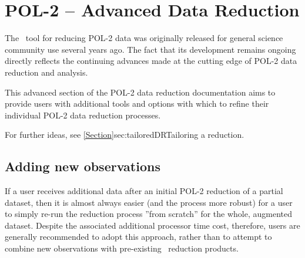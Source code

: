 \chapter{POL-2 -- Advanced Data Reduction}
\label{sec:advanced}

The \poltwomap\ tool for reducing POL-2 data was originally released for
general science community use several years ago. The fact that its
development remains ongoing directly reflects the continuing advances
made at the cutting edge of POL-2 data reduction and analysis.

This advanced section of the POL-2 data reduction documentation aims
to provide users with additional tools and options with which to refine their
individual POL-2 data reduction processes.

For further ideas, see \cref{Section}{sec:tailoredDR}{Tailoring a reduction}.

\section{Adding new observations}

If a user receives additional data after an initial POL-2 reduction of a partial dataset,
then it is almost always easier (and the process more robust) for a user to simply
re-run the reduction process ''from scratch'' for the whole, augmented dataset.
Despite the associated additional processor time cost, therefore, users are generally
recommended to adopt this approach, rather than to attempt to combine new
observations with pre-existing \poltwomap\ reduction products.

